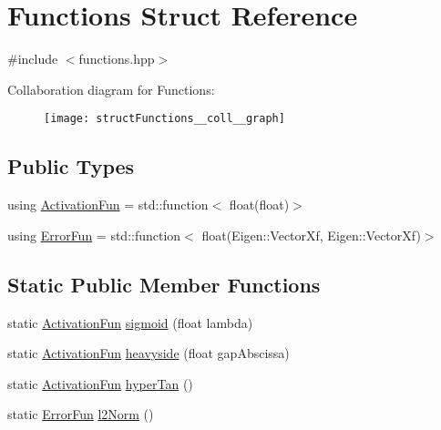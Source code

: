 \hypertarget{structFunctions}{}\section{Functions Struct Reference}
\label{structFunctions}


{\ttfamily \#include $<$functions.\+hpp$>$}



Collaboration diagram for Functions\+:
\nopagebreak
\begin{figure}[H]
\begin{center}
\leavevmode
\texttt{[image: structFunctions\_\_coll\_\_graph]}
\end{center}
\end{figure}
\subsection*{Public Types}
\begin{DoxyCompactItemize}
\item 
using \hyperlink{structFunctions_ad25362ffa52b2f7933431190546593ac}{Activation\+Fun} = std\+::function$<$ float(float)$>$
\item 
using \hyperlink{structFunctions_a834bc4170f1caa8c77272ecf51dbae5c}{Error\+Fun} = std\+::function$<$ float(Eigen\+::\+Vector\+Xf, Eigen\+::\+Vector\+Xf)$>$
\end{DoxyCompactItemize}
\subsection*{Static Public Member Functions}
\begin{DoxyCompactItemize}
\item 
static \hyperlink{structFunctions_ad25362ffa52b2f7933431190546593ac}{Activation\+Fun} \hyperlink{structFunctions_a773de9cd59f7ccc3e2fe9822f0536ae4}{sigmoid} (float lambda)
\item 
static \hyperlink{structFunctions_ad25362ffa52b2f7933431190546593ac}{Activation\+Fun} \hyperlink{structFunctions_a683c495693f3e2a5ec55e30edaccfd2d}{heavyside} (float gap\+Abscissa)
\item 
static \hyperlink{structFunctions_ad25362ffa52b2f7933431190546593ac}{Activation\+Fun} \hyperlink{structFunctions_a0aac84382fccbc38cacccd566434d4a8}{hyper\+Tan} ()
\item 
static \hyperlink{structFunctions_a834bc4170f1caa8c77272ecf51dbae5c}{Error\+Fun} \hyperlink{structFunctions_a00bac40f42bb6c47d25c0cd238c4275a}{l2\+Norm} ()
\end{DoxyCompactItemize}


